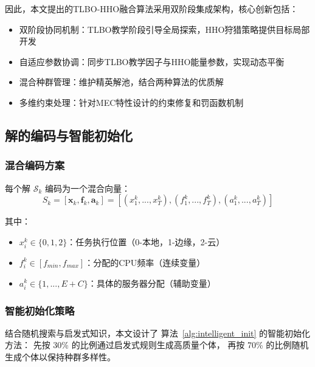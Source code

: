 \documentclass[conference]{IEEEtran}
\begin{document}
因此，本文提出的TLBO-HHO融合算法采用双阶段集成架构，核心创新包括：
\begin{itemize}
    \item 双阶段协同机制：TLBO教学阶段引导全局探索，HHO狩猎策略提供目标局部开发
    \item 自适应参数协调：同步TLBO教学因子与HHO能量参数，实现动态平衡
    \item 混合种群管理：维护精英解池，结合两种算法的优质解
    \item 多维约束处理：针对MEC特性设计的约束修复和罚函数机制
\end{itemize}
\subsection{解的编码与智能初始化}
\subsubsection{混合编码方案}
每个解 $\mathcal{S}_{k}$ 编码为一个混合向量：
\begin{equation}
S_k = [\mathbf{x}_k, \mathbf{f}_k, \mathbf{a}_k] = [(x_1^k, ..., x_T^k), (f_1^k, ..., f_T^k), (a_1^k, ..., a_T^k)]
\end{equation}

其中：
\begin{itemize}
    \item $\mathcal{}x_{i}^{k} \in \{0, 1, 2\}$：任务执行位置（0-本地，1-边缘，2-云）
    \item $\mathcal{}f_{i}^{k} \in [{f}_{min}, {f}_{max}]$：分配的CPU频率（连续变量）
    \item $\mathcal{}a_{i}^{k} \in \{1,..., E +C\}$：具体的服务器分配（辅助变量）
\end{itemize}

\subsubsection{智能初始化策略}
\label{subsec:intel_init}

结合随机搜索与启发式知识，本文设计了
算法~\ref{alg:intelligent_init} 的智能初始化方法：
先按 30\% 的比例通过启发式规则生成高质量个体，
再按 70\% 的比例随机生成个体以保持种群多样性。
\end{document}
